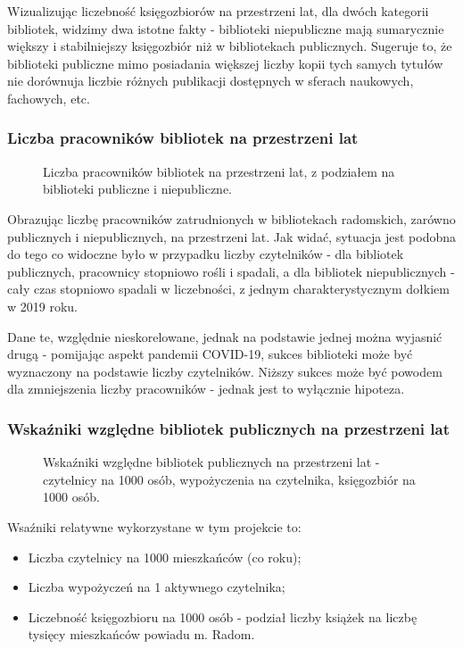 \documentclass[12pt]{article}
\begin{document}
Wizualizując liczebność księgozbiorów na przestrzeni lat, dla dwóch kategorii bibliotek, widzimy dwa istotne fakty - 
biblioteki niepubliczne mają sumarycznie większy i stabilniejszy księgozbiór niż w bibliotekach publicznych. 
Sugeruje to, że biblioteki publiczne mimo posiadania większej liczby kopii tych samych tytułów nie dorównuja liczbie 
różnych publikacji dostępnych w sferach naukowych, fachowych, etc.  

\subsubsection{Liczba pracowników bibliotek na przestrzeni lat}
\begin{figure}[H]
    
    \caption{Liczba pracowników bibliotek na przestrzeni lat, z podziałem na biblioteki publiczne i niepubliczne.}
\end{figure}

Obrazując liczbę pracowników zatrudnionych w bibliotekach radomskich, zarówno publicznych i niepublicznych, na przestrzeni lat.
Jak widać, sytuacja jest podobna do tego co widoczne było w przypadku liczby czytelników - dla bibliotek publicznych, pracownicy 
stopniowo rośli i spadali, a dla bibliotek niepublicznych - cały czas stopniowo spadali w liczebności, z jednym charakterystycznym
dołkiem w 2019 roku. 

Dane te, względnie nieskorelowane, jednak na podstawie jednej można wyjasnić drugą - pomijając aspekt pandemii COVID-19, 
sukces biblioteki może być wyznaczony na podstawie liczby czytelników. Niższy sukces może być powodem dla zmniejszenia 
liczby pracowników - jednak jest to wyłącznie hipoteza. 

\subsubsection{Wskaźniki względne bibliotek publicznych na przestrzeni lat}
\begin{figure}[H]
    
    \caption{Wskaźniki względne bibliotek publicznych na przestrzeni lat - czytelnicy na 1000 osób, wypożyczenia na czytelnika, 
    księgozbiór na 1000 osób.}
\end{figure}

Wsaźniki relatywne wykorzystane w tym projekcie to:
\begin{itemize}
    \item Liczba czytelnicy na 1000 mieszkańców (co roku);
    \item Liczba wypożyczeń na 1 aktywnego czytelnika;
    \item Liczebność księgozbioru na 1000 osób - podział liczby książek na liczbę tysięcy mieszkańców powiadu m. Radom.
\end{itemize}
\end{document}
